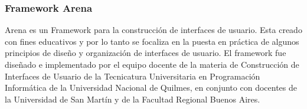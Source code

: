 \subsubsection{Framework Arena}
	Arena es un Framework para la construcción de interfaces de usuario. 
	Esta creado con fines educativos y por lo tanto se focaliza en la puesta en
	práctica de algunos principios de diseño y organización de
	interfaces de usuario.
	El framework fue diseñado e implementado por el equipo docente de la materia de
	Construcción de Interfaces de Usuario de la Tecnicatura Universitaria en Programación
	Informática de la Universidad Nacional de Quilmes, en conjunto con docentes de
	la Universidad de San Martín y de la Facultad Regional Buenos Aires.
	
	
